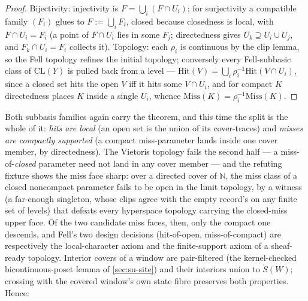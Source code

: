 \begin{proof}
Bijectivity: injectivity is $F = \bigcup_i (F \cap U_i)$; for
surjectivity a compatible family $(F_i)$ glues to
$F := \bigcup_i F_i$, closed because closedness is local, with
$F \cap U_i = F_i$ (a point of $F \cap U_i$ lies in some $F_j$;
directedness gives $U_k \supseteq U_i \cup U_j$, and
$F_k \cap U_i = F_i$ collects it). Topology: each $\rho_i$ is
continuous by the clip lemma, so the Fell topology refines the
initial topology; conversely every Fell-subbasic class of
$\mathrm{CL}(Y)$ is pulled back from a level ---
$\mathrm{Hit}(V) = \bigcup_i \rho_i^{-1}\mathrm{Hit}(V \cap U_i)$,
since a closed set hits the open $V$ iff it hits some $V \cap U_i$,
and for compact $K$ directedness places $K$ inside a single $U_i$,
whence $\mathrm{Miss}(K) = \rho_i^{-1}\mathrm{Miss}(K)$.
\end{proof}

Both subbasis families again carry the theorem, and this time the
split is the whole of it: \emph{hits are local} (an open set is the
union of its cover-traces) and \emph{misses are compactly supported}
(a compact miss-parameter lands inside one cover member, by
directedness). The Vietoris topology fails the second half --- a
miss-of-\emph{closed} parameter need not land in any cover member ---
and the refuting fixture shows the miss face sharp: over a directed
cover of $\mathbb{N}$, the miss class of a closed noncompact
parameter fails to be open in the limit topology, by a witness (a
far-enough singleton, whose clips agree with the empty record's on
any finite set of levels) that defeats every hyperspace topology
carrying the closed-miss upper face. Of the two candidate miss
faces, then, only the compact one descends, and Fell's two design
decisions (hit-of-open, miss-of-compact) are respectively the
local-character axiom and the finite-support axiom of a sheaf-ready
topology.
Interior covers of a window are pair-filtered (the
kernel-checked bicontinuous-poset lemma of
\autoref{sec:su-site}) and their
interiors union to $\mathring{S}(W)$; crossing with the covered
window's own state fibre preserves both properties. Hence:

